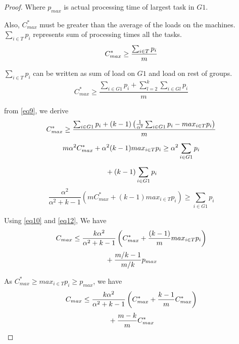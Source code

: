 \documentclass[10pt, conference, compsocconf]{IEEEtran}
\begin{document}
\begin{proof}
Where $p_{max}$ is actual processing time of largest task in $G1$. 

Also, $C_{max}^{*}$ must be greater than the average of the  loads on   the machines. $\sum_{i \in T }{{p_{i}}}$ represents sum of processing times all the tasks.
\begin{equation}{\nonumber}
C_{max}^{*} \geq  \frac{\sum_{i \in T }^{}{{p_{i}}}}{m}
\end{equation}

$\sum_{i \in T }{{p_{i}}}$ can be written as sum of load on $G1$ and load on rest of groups.
\begin{equation}\label{eq11}
 C_{max}^{*} \geq  \frac{\sum_{i \in G1 }^{}{{p_{i}}}+ \sum_{l=2}^{k}\sum_{i \in Gl }^{}{{p_{i}}}}{m}
\end{equation}

from \ref{eq9}, we derive
\begin{equation}{\nonumber}
 C_{max}^{*} \geq  \frac{\sum_{i \in G1 }^{}{{p_{i}}}+ (k-1)\left(\frac{1}{\alpha^{2}}\sum_{i \in G1 }^{}{{p_{i}}}-  {max_{i \in T}}{{p_{i}}}\right)}{m}
\end{equation}
\begin{equation}{\nonumber}
 m\alpha^{2}C_{max}^{*} + \alpha^{2} (k-1){max_{i \in T}}{{p_{i}}} \geq  \alpha^{2}\sum_{i \in G1 }^{}{{p_{i}}}  
\end{equation}
\begin{equation}{\nonumber}
 + (k-1)\sum_{i \in G1 }^{}{{p_{i}}} 
\end{equation}
\begin{equation}\label{eq12}
\frac{\alpha^{2}}{\alpha^{2}+k-1}\left(m C_{max}^{*}+(k-1) {max_{i \in T}}{{p_{i}}}\right) \geq \sum_{i \in G1 }^{}{{p_{i}}}  
\end{equation}

Using \ref{eq10} and \ref{eq12}, We have
\begin{equation}{\nonumber}
C_{max} \leq \frac{k\alpha^{2}}{\alpha^{2}+k-1}\left( C_{max}^{*}+\frac{(k-1)}{m} {max_{i \in T}}{{p_{i}}}\right)
\end{equation}
\begin{equation}{\nonumber}
 + {\frac{m/k-1}{m/k}} p_{max} 
\end{equation}

 As $C_{max}^{*}\geq {{max_{i \in T}}{p_{i}}}\geq p_{max}$, we have
\begin{equation}{\nonumber}
 C_{max} \leq \frac{k\alpha^{2}}{\alpha^{2}+k-1}\left( C_{max}^{*}+ {\frac{k-1}{m}}{C_{max}^{*}}\right)
  \end{equation}
 \begin{equation}{\nonumber}
   + {\frac{m-k}{m}} C_{max}^{*} 
   \end{equation}    
 

\end{proof}
\end{document}

